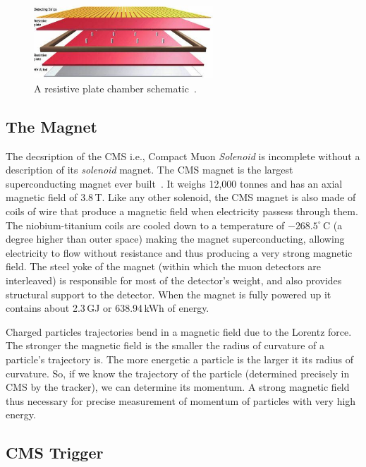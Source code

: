 \begin{figure}
\begin{center}
  \includegraphics[width=0.6\textwidth,keepaspectratio]{plots_and_figures/chapter3/RPC.jpg}
\caption{A resistive plate chamber schematic~\cite{muon2}.}
\label{fig:rpc}
\end{center}
\end{figure}

\subsection{The Magnet}
\label{CMS magnet}
The decsription of the CMS i.e., Compact Muon \textit{Solenoid} is incomplete without a description of its \textit{solenoid} magnet. The CMS magnet is the largest superconducting magnet ever built~\cite{magnet}. It weighs 12,000 tonnes and has an axial magnetic field of 3.8\,T. Like any other solenoid, the CMS magnet is also made of coils of wire that produce a magnetic field when electricity passess through them. The niobium-titanium coils are cooled down to a temperature of $-268.5^{\circ}\,\mathrm{C}$ (a degree higher than outer space) making the magnet superconducting, allowing electricity to flow without resistance and thus producing a very strong magnetic field. The steel yoke of the magnet (within which the muon detectors are interleaved) is responsible for most of the detector's weight, and also provides structural support to the detector. When the magnet is fully powered up it contains about 2.3\,GJ or 638.94\,kWh of energy.

Charged particles trajectories bend in a magnetic field due to the Lorentz force. The stronger the magnetic field is the smaller the radius of curvature of a particle's trajectory is. The more energetic a particle is the larger it its radius of curvature. So, if we know the trajectory of the particle (determined precisely in CMS by the tracker), we can determine its momentum. A strong magnetic field thus necessary for precise measurement of momentum of particles with very high energy.


\subsection{CMS Trigger}
\label{trigger}

